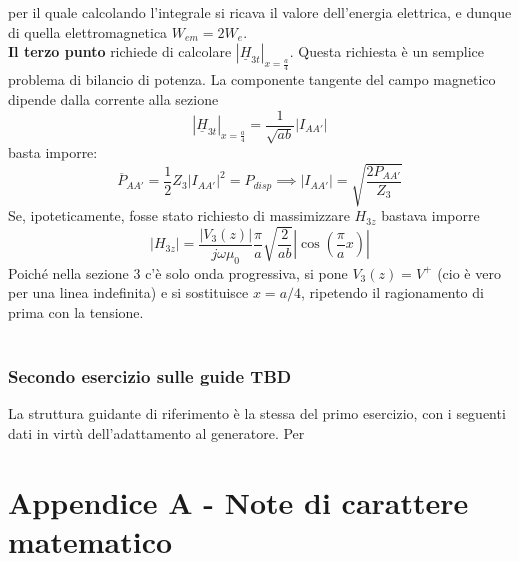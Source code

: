 \documentclass{book}
\begin{document}
    per il quale calcolando l'integrale si ricava il valore dell'energia elettrica, e dunque di quella elettromagnetica $W_{em}=2W_{e}$. \\
    \textbf{Il terzo punto} richiede di calcolare $|\underline{H}_{3t}|_{x = \frac{a}{4}}$. Questa richiesta è un semplice problema di bilancio di potenza.
    La componente tangente del campo magnetico dipende dalla corrente alla sezione
    \begin{equation}
        |\underline{H}_{3t}|_{x= \frac{a}{4}} = \frac{1}{\sqrt{ab}} |I_{AA'}|
    \end{equation}
    basta  imporre:
    \begin{equation}
        \overline{P}_{AA'} = \frac{1}{2} Z_{3} |I_{AA'}| ^{2} = P_{disp} \implies |I_{AA'}| = \sqrt{\frac{2P_{AA'}}{Z_{3}}}
    \end{equation}
    Se, ipoteticamente, fosse stato richiesto di massimizzare $H_{3z}$ bastava imporre
    \begin{equation}
        |H_{3z}| = \frac{|V_{3}(z)|}{j \omega \mu_{0}} \frac{\pi}{a} \sqrt{\frac{2}{ab}} |\cos(\frac{\pi}{a}x)|
    \end{equation}
    Poiché nella sezione $3$ c'è solo onda progressiva, si pone $V_{3}(z)=V^{+}$ (cio è vero per una linea indefinita) e si sostituisce $x=a/4$, ripetendo il ragionamento di prima con la tensione. \\ \\
    
    \subsection*{Secondo esercizio sulle guide TBD}
        La struttura guidante di riferimento è la stessa del primo esercizio, con i seguenti dati
    in virtù dell'adattamento al generatore. Per 
\chapter*{Appendice A - Note di carattere matematico}
\end{document}

